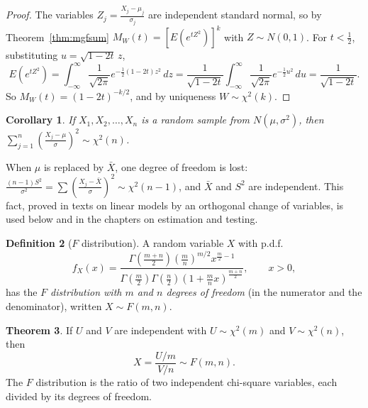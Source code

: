 \documentclass[12pt,a4paper]{report}
\theoremstyle{definition}
\newtheorem{thm}{Theorem}[section]
\newtheorem{definition}[thm]{Definition}
\theoremstyle{plain}
\newtheorem{coro}[thm]{Corollary}
\begin{document}
\begin{proof}
The variables $Z_j = \frac{X_j - \mu_j}{\sigma_j}$ are independent standard
normal, so by Theorem~\ref{thm:mgfsum}
$M_W(t) = \left[E\left(e^{tZ^2}\right)\right]^k$ with $Z\sim N(0,1)$. For
$t<\frac12$, substituting $u = \sqrt{1 - 2t}\,z$,
\[E\left(e^{tZ^2}\right) = \int^{\infty}_{-\infty} \frac{1}{\sqrt{2
\pi}}e^{-\frac{1}{2}(1 - 2t)z^2}\, dz = \frac{1}{\sqrt{1 - 2t}}\int^{\infty}_{-\infty}
\frac{1}{\sqrt{2\pi}}e^{-\frac{1}{2} u^2} \, du = \frac{1}{\sqrt{1 - 2t}} .\]
So $M_W(t) = (1 - 2t)^{-k/2}$, and by uniqueness $W\sim\chi^2(k)$.
\end{proof}

\begin{coro}
\label{cor:chisquaresample}
If $X_1, X_2,\dots, X_n$ is a random sample from $N(\mu, \sigma^2)$, then
$\sum^n_{j=1} \left( \frac{X_j - \mu}{\sigma}\right)^2 \sim \chi^2(n)$.
\end{coro}

When $\mu$ is replaced by $\bar X$, one degree of freedom is lost:
$\frac{(n - 1)S^2}{\sigma^2} = \sum\left(\frac{X_j - \bar X}{\sigma}\right)^2\sim
\chi^2(n - 1)$, and $\bar X$ and $S^2$ are independent. This fact, proved in
texts on linear models by an orthogonal change of variables, is used below and in
the chapters on estimation and testing.

\begin{definition}[$F$ distribution]
\label{def:fdist}
A random variable $X$ with p.d.f.
\[f_X(x) = \frac{\Gamma \left(\frac{m + n}{2}\right) \left(\frac{m}{n}\right)^{m/2}
x^{\frac{m}{2}-1}}{\Gamma\left(\frac{m}{2}\right)\Gamma \left(\frac{n}{2}\right)
\left(1 + \frac{m}{n}x\right)^{\frac{m+n}{2}}} ,\qquad x>0,\]
has the \emph{$F$ distribution with $m$ and $n$ degrees of freedom} (in the
numerator and the denominator), written $X\sim F(m,n)$.
\end{definition}

\begin{thm}
\label{thm:fratio}
If $U$ and $V$ are independent with $U\sim\chi^2(m)$ and $V\sim\chi^2(n)$, then
\[X = \frac{U/m}{V/n}\sim F(m,n) .\]
The $F$ distribution is the ratio of two independent chi-square variables, each
divided by its degrees of freedom.
\end{thm}
\end{document}
